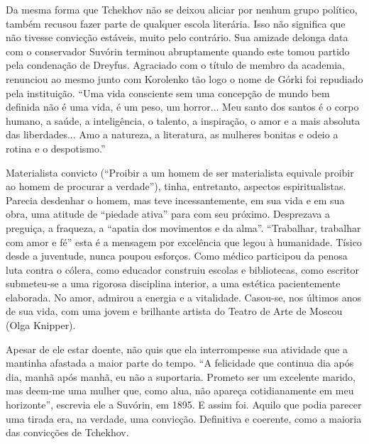 Da mesma forma que Tchekhov não se deixou aliciar por nenhum grupo
político, também recusou fazer parte de qualquer escola literária. Isso
não significa que não tivesse convicção estáveis, muito pelo contrário.
Sua amizade delonga data com o conservador Suvórin terminou abruptamente
quando este tomou partido pela condenação de Dreyfus. Agraciado com o
título de membro da academia, renunciou ao mesmo junto com Korolenko tão
logo o nome de Górki foi repudiado pela instituição. ``Uma vida
consciente sem uma concepção de mundo bem definida não é uma vida, é um
peso, um horror... Meu santo dos santos é o corpo humano, a saúde, a
inteligência, o talento, a inspiração, o amor e a mais absoluta das
liberdades... Amo a natureza, a literatura, as mulheres bonitas e odeio
a rotina e o despotismo.''

Materialista convicto (``Proibir a um homem de ser materialista equivale
proibir ao homem de procurar a verdade''), tinha, entretanto, aspectos
espiritualistas. Parecia desdenhar o homem, mas teve incessantemente, em
sua vida e em sua obra, uma atitude de ``piedade ativa'' para com seu
próximo. Desprezava a preguiça, a fraqueza, a ``apatia dos movimentos e
da alma''. ``Trabalhar, trabalhar com amor e fé'' esta é a mensagem por
excelência que legou à humanidade. Tísico desde a juventude, nunca
poupou esforços. Como médico participou da penosa luta contra o cólera,
como educador construiu escolas e bibliotecas, como escritor submeteu-se
a uma rigorosa disciplina interior, a uma estética pacientemente
elaborada. No amor, admirou a energia e a vitalidade. Casou-se, nos
últimos anos de sua vida, com uma jovem e brilhante artista do Teatro de
Arte de Moscou (Olga Knipper).

Apesar de ele estar doente, não quis que ela interrompesse sua atividade
que a mantinha afastada a maior parte do tempo. ``A felicidade que
continua dia após dia, manhã após manhã, eu não a suportaria. Prometo
ser um excelente marido, mas deem-me uma mulher que, como alua, não
apareça cotidianamente em meu horizonte'', escrevia ele a Suvórin, em
1895. E assim foi. Aquilo que podia parecer uma tirada era, na verdade,
uma convicção. Definitiva e coerente, como a maioria das convicções de
Tchekhov.

